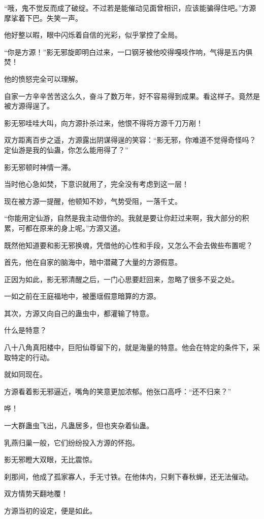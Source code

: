 \begin{this_body}
“哦，鬼不觉反而成了破绽。不过若是能催动见面曾相识，应该能骗得住吧。”方源摩挲着下巴。失笑一声。

他好整以暇，眼中闪烁着自信的光彩，似乎掌控了全局。

“你是方源！”影无邪旋即明白过来，一口钢牙被他咬得嘎吱作响，气得是五内俱焚！

他的愤怒完全可以理解。

自家一方辛辛苦苦这么久，奋斗了数万年，好不容易得到成果。看这样子。竟然是被方源得逞了。

影无邪哇哇大叫，向方源扑杀过来，他恨不得将方源千刀万剐！

双方距离百步之遥，方源露出阴谋得逞的笑容：“影无邪，你难道不觉得奇怪吗？定仙游是我的仙蛊，你怎么能用得了？”

影无邪顿时神情一滞。

当时他心急如焚，下意识就用了，完全没有考虑到这一层！

现在被方源一提醒，他顿知不妙，气势受阻，一落千丈。

“你能用定仙游，自然是我主动借你的。我就是要让你赶过来啊，我大部分的积累，可都在原来的身上呢。”方源又道。

既然他知道要和影无邪换魂，凭借他的心性和手段，又怎么不会去做些布置呢？

首先，他在自家的脑海中，暗中潜藏了大量的方源假意。

正因为如此，影无邪清醒之后，一门心思要赶回来，忽略了很多不妥之处。

一如之前在王庭福地中，被墨瑶假意暗算的方源。

其次，方源又向自己的蛊虫中，都灌输了特意。

什么是特意？

八十八角真阳楼中，巨阳仙尊留下的，就是海量的特意。他会在特定的条件下，采取特定的行动。

就如同现在。

方源看着影无邪逼近，嘴角的笑意更加浓郁。他张口高呼：“还不归来？”

哗！

一大群蛊虫飞出，凡蛊居多，但也夹杂着仙蛊。

乳燕归巢一般，它们纷纷投入方源的怀抱。

影无邪瞪大双眼，无比震惊。

刹那间，他成了孤家寡人，手无寸铁。在他体内，只剩下春秋蝉，还无法催动。

双方情势天翻地覆！

方源当初的设定，便是如此。


\end{this_body}
